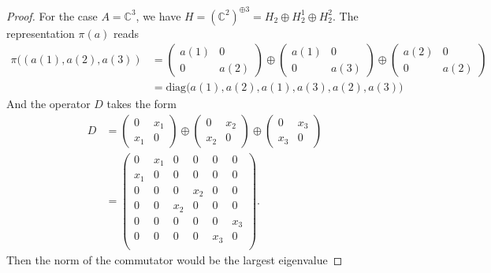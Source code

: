 \begin{proof}
    For the case $A=\mathbb{C}^3$, we have $H = (\mathbb{C}^2)^{\oplus 3} = H_2
    \oplus H_2^1 \oplus H_2^2$. The representation $\pi (a)$ reads
    \begin{align}
        \pi((a(1), a(2), a(3)) &=
        \begin{pmatrix}
            a(1) & 0 \\ 0 & a(2)
        \end{pmatrix} \oplus
        \begin{pmatrix}
            a(1) & 0 \\ 0 & a(3)
        \end{pmatrix} \oplus
        \begin{pmatrix}
            a(2) & 0 \\ 0 & a(2)
        \end{pmatrix} \nonumber  \\
                               & = \text{diag}\big(a(1), a(2), a(1), a(3), a(2),
                               a(3)\big)
    \end{align}
    And the operator $D$ takes the form
    \begin{align}
        D &=
        \begin{pmatrix}
            0 & x_1 \\ x_1 & 0
        \end{pmatrix} \oplus
        \begin{pmatrix}
            0 & x_2 \\ x_2 & 0
        \end{pmatrix} \oplus
        \begin{pmatrix}
            0 & x_3 \\ x_3 & 0
        \end{pmatrix} \nonumber \\
        &=
        \begin{pmatrix}
            0   & x_1 & 0 & 0 & 0 & 0 \\
            x_1 & 0   & 0 & 0 & 0 & 0 \\
            0   & 0   & 0 & x_2 & 0 & 0 \\
            0   & 0   & x_2 & 0 & 0 & 0 \\
            0   & 0   & 0 & 0 & 0 & x_3 \\
            0   & 0   & 0 & 0 & x_3 & 0 \\
        \end{pmatrix}.
    \end{align}
    Then the norm of the commutator would be the largest eigenvalue

\end{proof}

